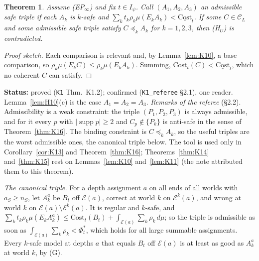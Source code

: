\documentclass[11pt]{article}
\newtheorem{theorem}{Theorem}[section]
\theoremstyle{definition}
\theoremstyle{remark}
\newcommand{\C}{\mathcal C}
\newcommand{\supp}{\operatorname{supp}}
\newcommand{\src}[1]{\texttt{#1}}
\newcommand{\status}[1]{\par\smallskip\noindent\textbf{Status:} #1\par\smallskip}
\begin{document}
\begin{theorem}\label{thm:K12}
Assume (EP$_\infty$) and fix $t\in I_\psi$. Call $(A_1,A_2,A_3)$ an \emph{admissible safe triple} if each $A_k$ is $k$-safe and $\sum_kt_k\rho_k\mu(E_kA_k)<\underline{\mathrm{Cost}}_t$. If some $C\in\C_L$ and some admissible safe triple satisfy $C\preceq_kA_k$ for $k=1,2,3$, then (H$_U$) is contradicted.
\end{theorem}
\begin{proof}[Proof sketch]
Each comparison is relevant and, by Lemma~\ref{lem:K10}, a base comparison, so $\rho_k\mu(E_kC)\le\rho_k\mu(E_kA_k)$. Summing, $\mathrm{Cost}_t(C)<\underline{\mathrm{Cost}}_t$, which no coherent $C$ can satisfy.
\end{proof}
\status{proved (\src{K1} Thm.~K1.2); confirmed (\src{K1\_referee} \S2.1), one reader. Lemma~\ref{lem:H10}(c) is the case $A_1=A_2=A_3$. \emph{Remarks of the referee} (\S2.2). Admissibility is a weak constraint: the triple $(P_1,P_2,P_3)$ is always admissible, and for it every $p$ with $|\supp p|\ge2$ and $C_p\notin\{P_k\}$ is anti-safe in the sense of Theorem~\ref{thm:K16}. The binding constraint is $C\preceq_kA_k$, so the useful triples are the worst admissible ones, the canonical triple below. The tool is used only in Corollary~\ref{cor:K13} and Theorem~\ref{thm:K16}; Theorems~\ref{thm:K14} and~\ref{thm:K15} rest on Lemmas~\ref{lem:K10} and~\ref{lem:K11} (the note attributed them to this theorem).}

\emph{The canonical triple.} For a depth assignment $a$ on all ends of all worlds with $a_S\ge n_S$, let $A^a_k$ be $B_t$ off $\mathcal E(a)$, correct at world $k$ on $\mathcal E^k(a)$, and wrong at world $k$ on $\mathcal E(a)\setminus\mathcal E^k(a)$. It is regular and $k$-safe, and $\sum_kt_k\rho_k\mu(E_kA^a_k)\le\mathrm{Cost}_t(B_t)+\int_{\mathcal E(a)}\sum_k\rho_k\,d\mu$; so the triple is admissible as soon as $\int_{\mathcal E(a)}\sum_k\rho_k<\Phi^*_t$, which holds for all large summable assignments. Every $k$-safe model at depths $a$ that equals $B_t$ off $\mathcal E(a)$ is at least as good as $A^a_k$ at world $k$, by (G).
\end{document}
